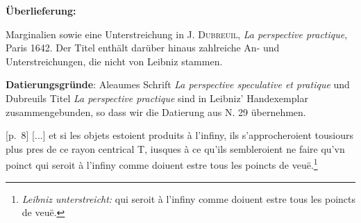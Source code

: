       
               
                \begin{ledgroupsized}[r]{120mm}
                \footnotesize 
                \pstart                
                \noindent\textbf{\"{U}berlieferung:}   
                \pend
                \end{ledgroupsized}
            
              
                            \begin{ledgroupsized}[r]{114mm}
                            \footnotesize 
                            \pstart \parindent -6mm
                            Marginalien sowie eine Unterstreichung in \textsc{J. Dubreuil}, \cite{00164}\textit{La perspective practique}, Paris 1642. Der Titel enth\"{a}lt dar\"{u}ber hinaus zahlreiche An- und Unter\-streichungen, die nicht von Leibniz stammen. \pend
                            \end{ledgroupsized}
                \vspace*{5mm}
                \begin{ledgroup}
                \footnotesize 
                \pstart
            \noindent\footnotesize{\textbf{Datierungsgr\"{u}nde}: Aleaumes\protect{} Schrift \cite{00003}\textit{La perspective speculative et pratique} und Dubreuils\protect{} Titel \cite{00164}\textit{La perspective practique} sind in Leibniz' Handexemplar zusammengebunden, so dass wir die Datierung aus N. 29 \"{u}bernehmen.}
                \pend
                \end{ledgroup}
            
                \vspace*{8mm}
                \pstart 
                \normalsize
            [p.~8] [...] et si les objets estoient produits \`{a} l'infiny, ils s'approcheroient tousiours plus pres de ce rayon centrical T, iusques \`{a} ce qu'ils sembleroient ne faire qu'vn poinct qui seroit \`{a} l'infiny comme doiuent estre tous les poincts de veuë.\footnote{\textit{Leibniz unterstreicht:} qui seroit \`{a} l'infiny comme doiuent estre tous les poincts de veuë.}